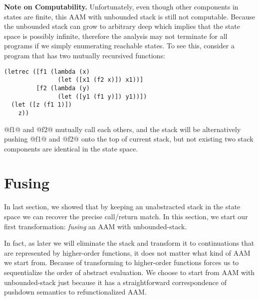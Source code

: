 \documentclass[acmsmall,review,anonymous]{acmart}\settopmatter{printfolios=true,printccs=false,printacmref=false}
\begin{document}
\textbf{Note on Computability.}
Unfortunately, even though other components in states are finite, 
this AAM with unbounded stack is still not computable. 
Because the unbounded stack can grow to arbitrary deep which implies that the state space is possibly 
infinite, therefore the analysis may not terminate for all programs if we simply enumerating 
reachable states.
To see this, consider a program that has two mutually recursived functions:

\begin{lstlisting}
(letrec ([f1 (lambda (x) 
               (let ([x1 (f2 x)]) x1))]
         [f2 (lambda (y)
               (let ([y1 (f1 y)]) y1))])
  (let ([z (f1 1)])
    z))
\end{lstlisting}

@f1@ and @f2@ mutually call each others, and the stack will be alternatively
pushing @f1@ and @f2@ onto the top of current stack, but not existing 
two stack components are identical in the state space.

\section{Fusing} \label{fusing}

In last section, we showed that by keeping an unabstracted stack in the state 
space we can recover the precise call/return match. In this section, we start
our first transformation: \textit{fusing} an AAM with unbounded-stack.

In fact, as later we will eliminate the stack and transform it to continuations
that are represented by higher-order functions, it does not matter what kind of 
AAM we start from. 
Because of transforming to higher-order functions forces us to sequentialize 
the order of abstract evaluation.
We choose to start from AAM with unbounded-stack just because it has a 
straightforward correspondence of pushdown semantics to refunctionalized AAM.
\end{document}
